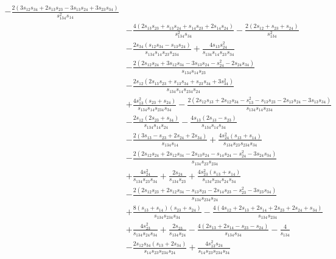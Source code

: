 \begin{align}
-\frac{2\left(
3s_{12}s_{34}+2s_{13}s_{23}
-3s_{13}s_{24}+3s_{23}s_{34}
\right)}
{s_{134}^{2}s_{14}}
 \nonumber \\
&-\frac{4\left(
2s_{13}s_{23}+s_{13}s_{24}
+s_{14}s_{23}+2s_{14}s_{24}
\right)}
{s_{134}^{2}s_{34}}
-\frac{2(2s_{12}+s_{23}+s_{24})}
{s_{134}^{2}}
 \nonumber \\
&-\frac{2s_{34}(s_{12}s_{34}-s_{13}s_{24})}
{s_{134}s_{14}s_{23}s_{234}}
+\frac{4s_{13}s_{24}^{2}}
{s_{134}s_{14}s_{23}s_{34}}
 \nonumber \\
&-\frac{2\left(
2s_{12}s_{24}+3s_{12}s_{34}
-3s_{13}s_{24}-s_{24}^{2}
-2s_{24}s_{34}
\right)}
{s_{134}s_{14}s_{23}}
 \nonumber \\
&-\frac{2s_{12}\left(
2s_{13}s_{23}+s_{13}s_{34}
+s_{23}s_{34}+3s_{34}^{2}
\right)}
{s_{134}s_{14}s_{234}s_{24}}
 \nonumber \\
&+\frac{4s_{13}^{2}(s_{23}+s_{24})}
{s_{134}s_{14}s_{234}s_{34}}
-\frac{2\left(
2s_{12}s_{13}+2s_{12}s_{34}
-s_{13}^{2}-s_{13}s_{23}
-2s_{13}s_{24}-3s_{13}s_{34}
\right)}
{s_{134}s_{14}s_{234}}
 \nonumber \\
&-\frac{2s_{12}(2s_{23}+s_{34})}
{s_{134}s_{14}s_{24}}
-\frac{4s_{13}(2s_{13}-s_{23})}
{s_{134}s_{14}s_{34}}
 \nonumber \\
&-\frac{2(3s_{13}-s_{23}+2s_{24}+2s_{34})}
{s_{134}s_{14}}
+\frac{4s_{24}^{2}(s_{13}+s_{14})}
{s_{134}s_{23}s_{234}s_{34}}
 \nonumber \\
&-\frac{2\left(
2s_{12}s_{24}+2s_{12}s_{34}
-2s_{13}s_{24}-s_{14}s_{24}
-s_{24}^{2}-3s_{24}s_{34}
\right)}
{s_{134}s_{23}s_{234}}
 \nonumber \\
&+\frac{4s_{24}^{2}}
{s_{134}s_{23}s_{34}}
+\frac{2s_{24}}{s_{134}s_{23}}
+\frac{4s_{23}^{2}(s_{13}+s_{14})}
{s_{134}s_{234}s_{24}s_{34}}
 \nonumber \\
&-\frac{2\left(
2s_{12}s_{23}+2s_{12}s_{34}
-s_{13}s_{23}-2s_{14}s_{23}
-s_{23}^{2}-3s_{23}s_{34}
\right)}
{s_{134}s_{234}s_{24}}
 \nonumber \\
&+\frac{8(s_{13}+s_{14})(s_{23}+s_{24})}
{s_{134}s_{234}s_{34}}
-\frac{4\left(
4s_{12}+2s_{13}+2s_{14}
+2s_{23}+2s_{24}+s_{34}
\right)}
{s_{134}s_{234}}
 \nonumber \\
&+\frac{4s_{23}^{2}}
{s_{134}s_{24}s_{34}}
+\frac{2s_{23}}{s_{134}s_{24}}
-\frac{4(2s_{13}+2s_{14}-s_{23}-s_{24})}
{s_{134}s_{34}}
-\frac{4}{s_{134}}
 \nonumber \\[1mm]
&-\frac{2s_{12}s_{34}(s_{13}+2s_{34})}
{s_{14}s_{23}s_{234}s_{24}}
+\frac{4s_{13}^{2}s_{24}}
{s_{14}s_{23}s_{234}s_{34}}
 \nonumber \\

\end{align}
